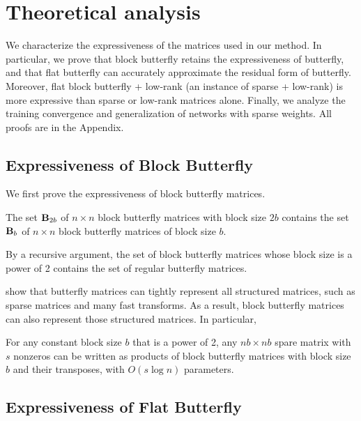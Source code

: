 \section{Theoretical analysis}
\label{sec:analysis}

We characterize the expressiveness of the matrices used in our method.
In particular, we prove that block butterfly retains the expressiveness
of butterfly, and that flat butterfly can accurately approximate the
residual form of butterfly.
Moreover, flat block butterfly + low-rank (an instance of sparse +
low-rank) is more expressive than sparse or low-rank matrices alone.
Finally, we analyze the training convergence and generalization of networks
with sparse weights.
All proofs are in the Appendix.

\subsection{Expressiveness of Block Butterfly}
We first prove the expressiveness of block butterfly matrices.
\begin{theorem}
  \label{thm:block_butterfly}
  The set $\mathbf{B}_{2b}$ of $n \times n$ block butterfly matrices with block size $2b$ contains
  the set $\mathbf{B}_b$ of $n \times n$ block butterfly matrices of block size $b$.
\end{theorem}
By a recursive argument, the set of block butterfly matrices whose block size is
a power of 2 contains the set of regular butterfly matrices.

\citet{dao2020kaleidoscope} show that butterfly matrices can tightly represent
all structured matrices, such as sparse matrices and many fast transforms.
As a result, block butterfly matrices can also represent those structured
matrices.
In particular,
\begin{corollary}
  \label{cor:block_butterfly_contains_sparse}
  For any constant block size $b$ that is a power of 2, any $nb \times nb$ spare
  matrix with $s$ nonzeros can be written as products of block butterfly
  matrices with block size $b$ and their transposes, with $O(s \log n)$
  parameters.
\end{corollary}

\subsection{Expressiveness of Flat Butterfly}


